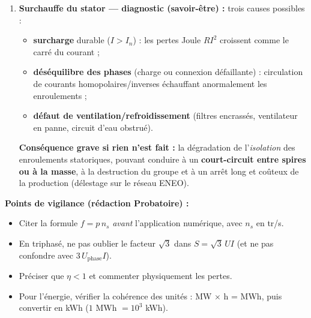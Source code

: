 \documentclass[11pt]{article}
\begin{document}
\begin{corrige}
\begin{enumerate}
\item \textbf{Surchauffe du stator — diagnostic (savoir-être) :} trois causes possibles :
\begin{itemize}
\item \textbf{surcharge} durable ($I > I_n$) : les pertes Joule $R I^2$ croissent comme le carré du courant ;
\item \textbf{déséquilibre des phases} (charge ou connexion défaillante) : circulation de courants homopolaires/inverses échauffant anormalement les enroulements ;
\item \textbf{défaut de ventilation/refroidissement} (filtres encrassés, ventilateur en panne, circuit d'eau obstrué).
\end{itemize}
\textbf{Conséquence grave si rien n'est fait :} la dégradation de l'\emph{isolation} des enroulements statoriques, pouvant conduire à un \textbf{court-circuit entre spires ou à la masse}, à la destruction du groupe et à un arrêt long et coûteux de la production (délestage sur le réseau ENEO).
\end{enumerate}

\textbf{Points de vigilance (rédaction Probatoire) :}
\begin{itemize}
\item Citer la formule $f = p\,n_s$ \emph{avant} l'application numérique, avec $n_s$ en tr/s.
\item En triphasé, ne pas oublier le facteur $\sqrt{3}$ dans $S = \sqrt{3}\,UI$ (et ne pas confondre avec $3\,U_{\text{phase}} I$).
\item Préciser que $\eta < 1$ et commenter physiquement les pertes.
\item Pour l'énergie, vérifier la cohérence des unités : MW $\times$ h = MWh, puis convertir en kWh ($1$ MWh $= 10^3$ kWh).
\end{itemize}
\end{corrige}
\end{document}
